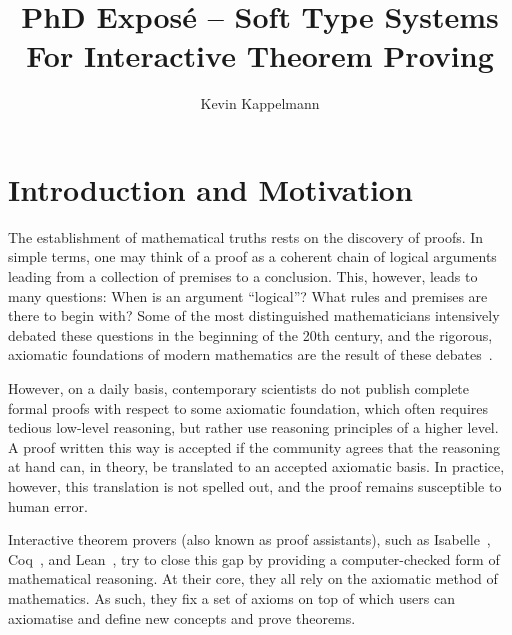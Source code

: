 \documentclass[a4paper, 12pt]{article}
\title{\textbf{PhD Exposé -- Soft Type Systems For Interactive Theorem Proving}}
\author{Kevin Kappelmann}
\date{\vspace{-5ex}}
\theoremstyle{plain}
\theoremstyle{definition}
\begin{document}
\maketitle


{}

\section{Introduction and Motivation}\label{sec:intro}

The establishment of mathematical truths rests on
the discovery of proofs.
In simple terms, one may think of a proof
as a coherent chain of logical arguments
leading from a collection of premises to a conclusion.
This, however, leads to many questions:
When is an argument ``logical''?
What rules and premises are there to begin with?
Some of the most distinguished mathematicians
intensively debated these questions in the beginning of the 20th century,
and the rigorous, axiomatic foundations of modern mathematics are the result of these debates~\cite{hilbertprogram}.

However, on a daily basis,
contemporary scientists do not publish
complete formal proofs with respect to some axiomatic foundation,
which often requires tedious low-level reasoning,
but rather use reasoning principles of a higher level.
A proof written this way is accepted if the community agrees that the reasoning at hand can, in theory,
be translated to an accepted axiomatic basis.
In practice, however,
this translation is not spelled out,
and the proof remains susceptible to human error.

Interactive theorem provers (also known as proof assistants),
such as Isabelle~\cite{isabelle}, Coq~\cite{coq}, and Lean~\cite{lean},
try to close this gap by providing
a computer-checked form of mathematical reasoning.
At their core,
they all rely on the axiomatic method of mathematics.
As such,
they fix a set of axioms on top of which users
can axiomatise and define new concepts and prove theorems.
\end{document}
